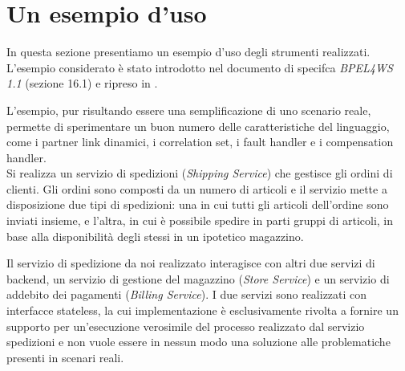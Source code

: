 
\section{Un esempio d'uso}

In questa sezione presentiamo un esempio d'uso degli strumenti
realizzati. L'esempio considerato è stato introdotto nel documento di specifca
\emph{BPEL4WS 1.1} \cite{BPEL11Spec} (sezione 16.1) e ripreso in
\cite{LaPuTie1}.

L'esempio, pur risultando essere una semplificazione di uno scenario reale,
permette di sperimentare un buon numero delle caratteristiche del linguaggio,	
come i partner link dinamici, i correlation set, i fault handler e i
compensation handler.
\\

Si realizza un servizio di spedizioni (\emph{Shipping Service}) che gestisce
gli ordini di clienti. Gli ordini sono composti da un numero di
articoli e il servizio mette a disposizione due tipi di spedizioni: una in cui
tutti gli articoli dell'ordine sono inviati insieme, e l'altra, in cui è
possibile spedire in parti gruppi di articoli, in base alla disponibilità degli stessi in
un ipotetico magazzino.

Il servizio di spedizione da noi realizzato interagisce con altri due servizi
di backend, un servizio di gestione del magazzino (\emph{Store Service}) e un
servizio di addebito dei pagamenti (\emph{Billing Service}). I due servizi
sono realizzati con interfacce stateless, la cui implementazione è
esclusivamente rivolta a fornire un supporto per un'esecuzione verosimile del
processo realizzato dal servizio spedizioni e non vuole essere in nessun modo
una soluzione alle problematiche presenti in scenari reali.

